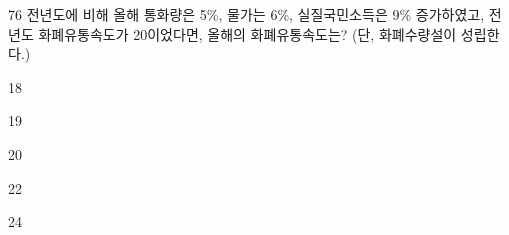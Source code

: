 \begin{question}{76}
전년도에 비해 올해 통화량은 5\%, 물가는 6\%, 실질국민소득은 9\% 증가하였고, 전년도 화폐유통속도가 20이었다면, 올해의 화폐유통속도는? (단, 화폐수량설이 성립한다.)
\begin{choices}
  \item 18
  \item 19
  \item 20
  \item 22
  \item 24
\end{choices}
\end{question}
